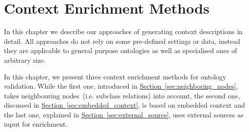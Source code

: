 \chapter{Context Enrichment Methods}\label{chap:context_enrichment_methods}
In this chapter we describe our approaches of generating context descriptions in detail. All approaches do not rely on some pre-defined settings or data, instead they are applicable to general purpose ontologies as well as specialised ones of arbitrary size.

In this chapter, we present three context enrichment methods for ontology validation. While the first one, introduced in \hyperref[sec:neighboring_nodes]{Section~\ref*{sec:neighboring_nodes}}, takes neighbouring nodes~(i.e. subclass relations) into account, the second one, discussed in \hyperref[sec:embedded_context]{Section~\ref*{sec:embedded_context}}, is based on embedded context and the last one, explained in \hyperref[sec:external_source]{Section~\ref*{sec:external_source}}, uses external sources as input for enrichment. 












